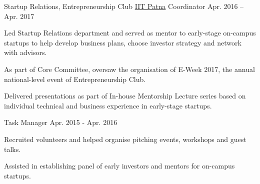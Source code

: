 \begin{cvpositions}
\cvroletwo
	{Startup Relations, Entrepreneurship Club} %
	{\href{https://www.iitp.ac.in}{IIT Patna}} %
	{Coordinator} %
	{Apr. 2016 -- Apr. 2017} %
	{\begin{cvitems} %
		\item {Led Startup Relations department and served as mentor to early-stage on-campus startups to help develop business plans, choose investor strategy and network with advisors.}
		\item {As part of Core Committee, oversaw the organisation of E-Week 2017, the annual national-level event of Entrepreneurship Club.}
		\item {Delivered presentations as part of In-house Mentorship Lecture series based on individual technical and business experience in early-stage startups.}
	\end{cvitems}}
	{Task Manager} %
	{Apr. 2015 - Apr. 2016} %
	{\begin{cvitems} %
		\item {Recruited volunteers and helped organise pitching events, workshops and guest talks.}
		\item {Assisted in establishing panel of early investors and mentors for on-campus startups.}
	\end{cvitems}}

\end{cvpositions}
